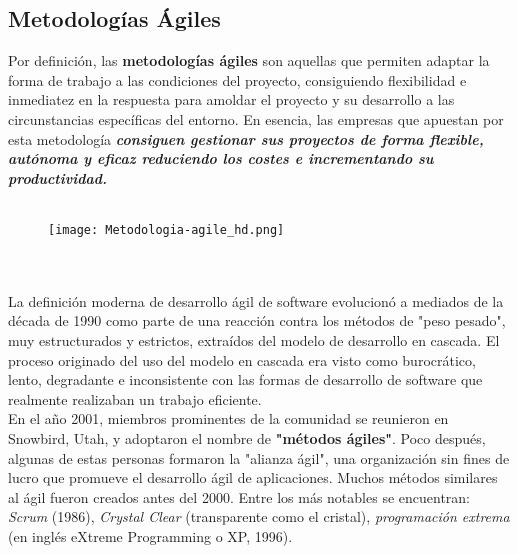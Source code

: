 \documentclass{article}
\begin{document}
\newpage
\subsection{Metodologías Ágiles}
Por definición, las \textbf{metodologías ágiles} son aquellas que permiten adaptar la forma de trabajo a las condiciones del proyecto, consiguiendo flexibilidad e inmediatez en la respuesta para 
amoldar el proyecto y su desarrollo a las circunstancias específicas del entorno. En esencia, las empresas que apuestan por esta metodología \textbf{\textit{consiguen gestionar sus proyectos de forma 
flexible, autónoma y eficaz reduciendo los costes e incrementando su productividad.}}
\\
\\
\begin{figure}[h]
    \texttt{[image: Metodologia-agile\_hd.png]}
    \centering
\end{figure}
\\
\\
La definición moderna de desarrollo ágil de software evolucionó a mediados de la década de 1990 como parte de una reacción contra los métodos de "peso pesado", muy estructurados y estrictos, 
extraídos del modelo de desarrollo en cascada. El proceso originado del uso del modelo en cascada era visto como burocrático, lento, degradante e inconsistente con las formas de desarrollo de 
software que realmente realizaban un trabajo eficiente. 
\\
En el año 2001, miembros prominentes de la comunidad se reunieron en Snowbird, Utah, y adoptaron el nombre de \textbf{"métodos ágiles"}. Poco después, algunas de estas personas formaron la "alianza ágil", 
una organización sin fines de lucro que promueve el desarrollo ágil de aplicaciones. Muchos métodos similares al ágil fueron creados antes del 2000. Entre los más notables se encuentran: \textit{Scrum} (1986), 
\textit{Crystal Clear} (transparente como el cristal), \textit{programación extrema} (en inglés eXtreme Programming o XP, 1996).

\newpage
\end{document}
